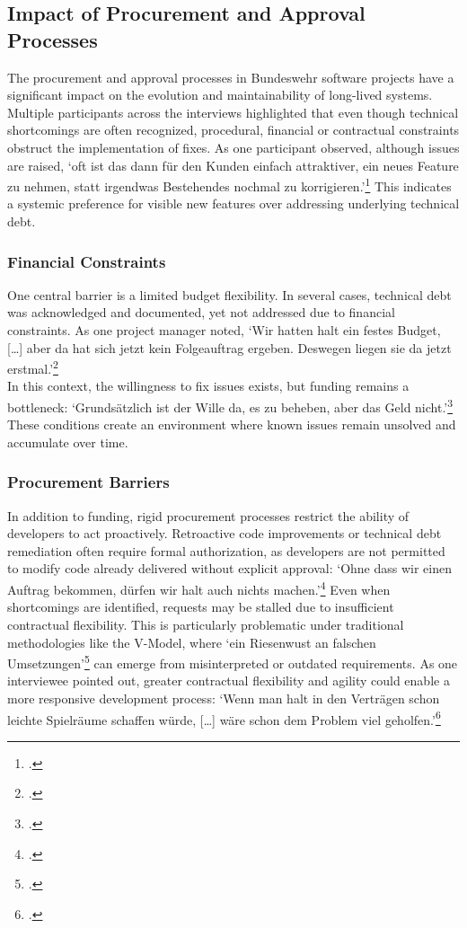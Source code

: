 \subsection{Impact of Procurement and Approval Processes}
The procurement and approval processes in Bundeswehr software projects have a significant impact on the evolution and maintainability of long-lived systems. Multiple participants across the interviews highlighted that even though technical shortcomings are often recognized, 
procedural, financial or contractual constraints obstruct the implementation of fixes. As one participant observed, although issues are raised, `oft ist das dann für den Kunden einfach attraktiver, ein neues Feature zu nehmen, statt irgendwas Bestehendes nochmal zu korrigieren.'\footcite{Interview32025}
This indicates a systemic preference for visible new features over addressing underlying technical debt.

\subsubsection{Financial Constraints}
One central barrier is a limited budget flexibility. In several cases, technical debt was acknowledged and documented, yet not addressed due to financial constraints. As one project manager noted, `Wir hatten halt ein festes Budget, [\ldots] aber da hat sich jetzt kein Folgeauftrag ergeben. Deswegen liegen sie da jetzt erstmal.'\footcite{Interview12025}\\
In this context, the willingness to fix issues exists, but funding remains a bottleneck: `Grundsätzlich ist der Wille da, es zu beheben, aber das Geld nicht.'\footcite{Interview32025} These conditions create an environment where known issues remain unsolved and accumulate over time.

\subsubsection{Procurement Barriers}
In addition to funding, rigid procurement processes restrict the ability of developers to act proactively. Retroactive code improvements or technical debt remediation often require formal authorization, as developers are not permitted to modify code already delivered without explicit approval:
`Ohne dass wir einen Auftrag bekommen, dürfen wir halt auch nichts machen.'\footcite{Interview32025} Even when shortcomings are identified, requests may be stalled due to insufficient contractual flexibility. This is particularly problematic under traditional methodologies like the V-Model, where
`ein Riesenwust an falschen Umsetzungen'\footcite{Interview32025} can emerge from misinterpreted or outdated requirements. As one interviewee pointed out, greater contractual flexibility and agility could enable a more responsive development process:
`Wenn man halt in den Verträgen schon leichte Spielräume schaffen würde, [\ldots] wäre schon dem Problem viel geholfen.'\footcite{Interview32025}\\

